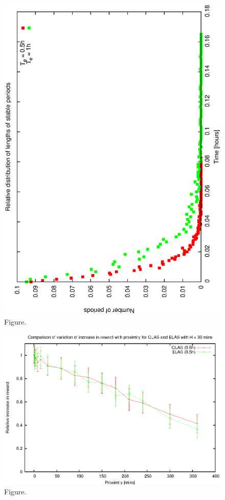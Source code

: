 \documentclass[12pt,a4paper]{article}
\begin{document}
\begin{figure}[htbp]
 \begin{center}
  \includegraphics[scale=1.0, angle=0]{figures/e_relstats.eps}
 \end{center}
  \caption[Figure.]
{Figure.}
\end{figure}
\clearpage
\begin{figure}[htbp]
 \begin{center}
  \includegraphics[scale=1.0, angle=0]{figures/evplot_05.eps}
 \end{center}
  \caption[Figure.]
{Figure.}
\end{figure}
\end{document}
